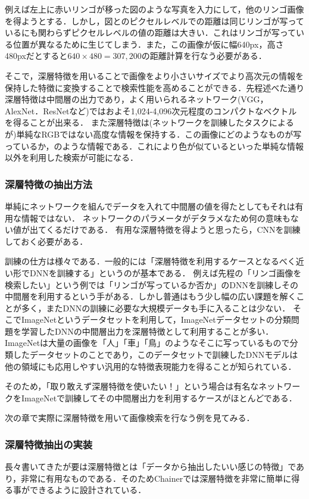 例えば左上に赤いリンゴが移った図のような写真を入力にして，他のリンゴ画像を得ようとする．しかし，図とのピクセルレベルでの距離は同じリンゴが写っているにも関わらずピクセルレベルの値の距離は大きい．これはリンゴが写っている位置が異なるために生じてしまう．また，この画像が仮に幅640px，高さ480pxだとすると$640 \times 480 = 307,200$の距離計算を行なう必要がある．

そこで，深層特徴を用いることで画像をより小さいサイズでより高次元の情報を保持した特徴に変換することで検索性能を高めることができる．先程述べた通り深層特徴は中間層の出力であり，よく用いられるネットワーク(VGG，AlexNet．ResNetなど)ではおよそ1,024-4,096次元程度のコンパクトなベクトルを得ることが出来る．
また深層特徴は(ネットワークを訓練したタスクによるが)単純なRGBではない高度な情報を保持する．この画像にどのようなものが写っているか，のような情報である．これにより色が似ているといった単純な情報以外を利用した検索が可能になる．


\subsubsection{深層特徴の抽出方法}
単純にネットワークを組んでデータを入れて中間層の値を得たとしてもそれは有用な情報ではない．
ネットワークのパラメータがデタラメなため何の意味もない値が出てくるだけである．
有用な深層特徴を得ようと思ったら，CNNを訓練しておく必要がある．

訓練の仕方は様々である．一般的には「深層特徴を利用するケースとなるべく近い形でDNNを訓練する」というのが基本である．
例えば先程の「リンゴ画像を検索したい」という例では「リンゴが写っているか否か」のDNNを訓練しその中間層を利用するという手がある．しかし普通はもう少し幅の広い課題を解くことが多く，またDNNの訓練に必要な大規模データも手に入ることは少ない．
そこでImageNetというデータセットを利用して，ImageNetデータセットの分類問題を学習したDNNの中間層出力を深層特徴として利用することが多い．
ImageNetは大量の画像を「人」「車」「鳥」のようなそこに写っているもので分類したデータセットのことであり，このデータセットで訓練したDNNモデルは他の領域にも応用しやすい汎用的な特徴表現能力を得ることが知られている．

そのため，「取り敢えず深層特徴を使いたい！」という場合は有名なネットワークをImageNetで訓練してその中間層出力を利用するケースがほとんどである．


次の章で実際に深層特徴を用いて画像検索を行なう例を見てみる．


\subsubsection{深層特徴抽出の実装}
長々書いてきたが要は深層特徴とは「データから抽出したいい感じの特徴」であり，非常に有用なものである．そのためChainerでは深層特徴を非常に簡単に得る事ができるように設計されている．


